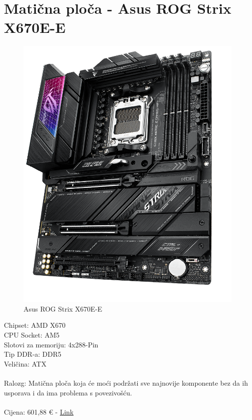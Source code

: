 \documentclass{report}
\begin{document}
\section{Matična ploča - Asus ROG Strix X670E-E}
\begin{figure}[H]
    \centering
    \includegraphics[scale=0.2]{Slike/ROG-Strix-X670E-E-Gaming.png}
    \caption{Asus ROG Strix X670E-E}
    \label{fig:Maticna}
\end{figure}
Chipset: AMD X670\\CPU Socket: AM5\\Slotovi za memoriju: 4x288-Pin\\Tip DDR-a: DDR5\\ Veličina: ATX\\\\Ralozg: Matična ploča koja će moći podržati sve najnovije komponente bez da ih usporava i da ima problema s povezivošću.\\\\Cijena: 601,88 € - \href{https://www.instar-informatika.hr/maticna-ploca-asus-rog-strix-x670e-e-gaming-wifi-amd-am5-wifi-bluet/153942/product/}{Link}
\end{document}
